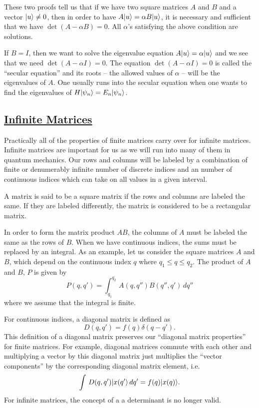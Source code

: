 These two proofs tell us that if we have two square matrices $A$ and $B$ and a vector $|u\rangle \ne 0$, then in order to have $A|u\rangle = \alpha B|u\rangle$, it is necessary and sufficient that we have $\det(A-\alpha B) = 0$. All $\alpha$'s
satisfying the above condition are solutions. 

If $B = I$, then we want to solve the eigenvalue equation $A|u\rangle = \alpha |u\rangle$ and we see that we need $\det(A-\alpha I) = 0$. The equation $\det(A - \alpha I) = 0$ is called the ``secular equation'' and its roots -- the allowed values
of $\alpha$ -- will be the eigenvalues of $A$. One usually runs into the secular equation when one wants to find the eigenvalues of $H|\psi_n\rangle = E_n|\psi_n\rangle$. 

\subsection{\underline{Infinite Matrices}}
Practically all of the properties of finite matrices carry over for infinite matrices. Infinite matrices are important for us as we will run into many of them in quantum mechanics. Our rows and columns will be labeled by a combination of
finite or denumerably infinite number of discrete indices and an number of continuous indices which can take on all values in a given interval.

A matrix is said to be a square matrix if the rows and columns are labeled the same. If they are labeled differently, the matrix is considered to be a rectangular matrix. 

In order to form the matrix product $AB$, the columns of $A$ must be labeled the same as the rows of $B$. When we have continuous indices, the sums must be replaced by an integral. As an example, let us consider the 
square matrices $A$ and $B$, which depend on the continuous index $q$ where $q_1 \le q \le q_2$. The product of $A$ and $B$, $P$ is given by 
$$P(q,q') = \int_{q_1}^{q_2} \, A(q,q'') B(q'',q')\, dq''$$ where we assume that the integral is finite.

For continuous indices, a diagonal matrix is defined as $$D(q,q') = f(q)\delta(q-q').$$ This definition of a diagonal matrix preserves our ``diagonal matrix properties'' for finite matrices. For example, diagonal matrices commute with each
other and multiplying a vector by this diagonal matrix just multiplies the ``vector components'' by the corresponding diagonal matrix element, i.e.
$$\int\, D(q,q')|x(q'\rangle\, dq' = f(q)|x(q)\rangle.$$
For infinite matrices, the concept of a a determinant is no longer valid.

